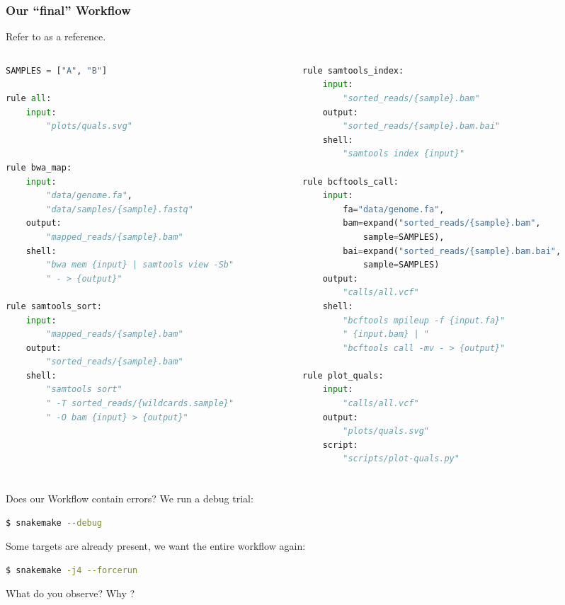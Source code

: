 \begin{frame}[fragile]
  \frametitle{Our ``final'' Workflow}
  Refer to  as a reference.
  \begin{columns}
    \begin{column}{0.5\textwidth}
      \begin{lstlisting}[language=Python,style=Python,basicstyle=\tiny]
SAMPLES = ["A", "B"]

rule all:
    input:
        "plots/quals.svg"


rule bwa_map:
    input:
        "data/genome.fa",
        "data/samples/{sample}.fastq"
    output:
        "mapped_reads/{sample}.bam"
    shell:
        "bwa mem {input} | samtools view -Sb"
        " - > {output}"

rule samtools_sort:
    input:
        "mapped_reads/{sample}.bam"
    output:
        "sorted_reads/{sample}.bam"
    shell:
        "samtools sort"
        " -T sorted_reads/{wildcards.sample}"
        " -O bam {input} > {output}"
      \end{lstlisting}
    \end{column}
    \begin{column}{0.5\textwidth}
      \begin{lstlisting}[language=Python,style=Python,basicstyle=\tiny]
rule samtools_index:
    input:
        "sorted_reads/{sample}.bam"
    output:
        "sorted_reads/{sample}.bam.bai"
    shell:
        "samtools index {input}"

rule bcftools_call:
    input:
        fa="data/genome.fa",
        bam=expand("sorted_reads/{sample}.bam",
            sample=SAMPLES),
        bai=expand("sorted_reads/{sample}.bam.bai",
            sample=SAMPLES)
    output:
        "calls/all.vcf"
    shell:
        "bcftools mpileup -f {input.fa}"
        " {input.bam} | "
        "bcftools call -mv - > {output}"

rule plot_quals:
    input:
        "calls/all.vcf"
    output:
        "plots/quals.svg"
    script:
        "scripts/plot-quals.py"
      \end{lstlisting}
    \end{column}
  \end{columns}
\end{frame}

\begin{frame}[fragile]
  \frametitle{}
  Does our Workflow contain errors? We run a debug trial:
  \begin{lstlisting}[language=Bash, style=Shell]
$ snakemake --debug
  \end{lstlisting}
  \pause
  Some targets are already present, we want the entire workflow again:
  \begin{lstlisting}[language=Bash, style=Shell]
$ snakemake -j4 --forcerun
  \end{lstlisting}
  \begin{question}
  	What do you observe? Why ?
  \end{question}
\end{frame}

